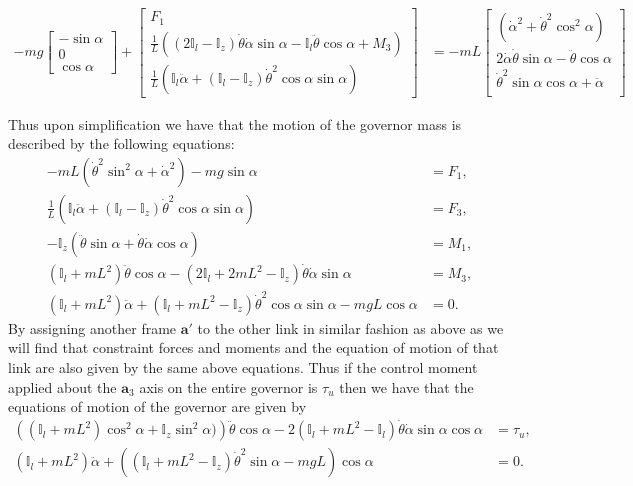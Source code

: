 \documentclass[graybox,envcountchap,sectrefs]{svmonoMuga}
\begin{document}
\begin{align*}
-mg\left[\begin{matrix}
  -\sin{\alpha} \\
  0\\
  \cos{\alpha}
 \end{matrix}\right]
+ \left[\begin{matrix}
  F_1 \\
   \frac{1}{L}\left((2\mathbb{I}_l-\mathbb{I}_z)\dot{\theta}\dot{\alpha}\sin\alpha-\mathbb{I}_l\ddot{\theta}\cos\alpha+M_3\right)\\
 \frac{1}{L} \left(\mathbb{I}_l\ddot{\alpha} +(\mathbb{I}_l-\mathbb{I}_z)\dot{\theta}^2\cos\alpha\sin\alpha\right)
 \end{matrix}\right]&=-mL\begin{bmatrix}(\dot{\alpha}^2+\dot{\theta}^2\cos^2\alpha)\\
2 \dot{\alpha}\dot{\theta}\sin\alpha-\ddot{\theta}\cos\alpha\\
 \dot{\theta}^2\sin\alpha\cos\alpha+\ddot{\alpha}\\
 \end{bmatrix}
 \end{align*}

Thus upon simplification we have that the motion of the governor mass is described by the following equations:
\begin{align}
-mL(\dot{\theta}^2\sin^2\alpha+\dot{\alpha}^2)-mg\sin\alpha &=F_1,\\
\frac{1}{L}\left(\mathbb{I}_l\ddot{\alpha} +(\mathbb{I}_l-\mathbb{I}_z)\dot{\theta}^2\cos\alpha\sin\alpha\right)&=F_3,\\
-\mathbb{I}_z(\ddot{\theta}\sin\alpha+\dot{\theta}\dot{\alpha}\cos\alpha )&=M_1,\\
(\mathbb{I}_l+mL^2)\ddot{\theta}\cos\alpha - (2\mathbb{I}_l+2mL^2-\mathbb{I}_z)\dot{\theta}\dot{\alpha}\sin\alpha&=M_3,\\
(\mathbb{I}_l+mL^2)\ddot{\alpha}+(\mathbb{I}_l+mL^2-\mathbb{I}_z)\dot{\theta}^2\cos\alpha\sin\alpha-mgL\cos\alpha&=0.
\end{align}
By assigning another frame $\mathbf{a}'$ to the other link in similar fashion as above as we will find that constraint forces and moments and the equation of motion of that link are also given by the same above equations. Thus if the control moment applied about the $\mathbf{a}_3$ axis on the entire governor is $\tau_u$ then we have that the equations of motion of the governor are given by
\begin{align}
\left((\mathbb{I}_l+mL^2)\cos^2\alpha+\mathbb{I}_z\sin^2\alpha)\right)\ddot{\theta}\cos\alpha - 2(\mathbb{I}_l+mL^2-\mathbb{I}_l)\dot{\theta}\dot{\alpha}\sin\alpha\cos\alpha&=\tau_u,\\
(\mathbb{I}_l+mL^2)\ddot{\alpha}+\left((\mathbb{I}_l+mL^2-\mathbb{I}_z)\dot{\theta}^2\sin\alpha-mgL\right)\cos\alpha&=0.
\end{align}
\end{document}
